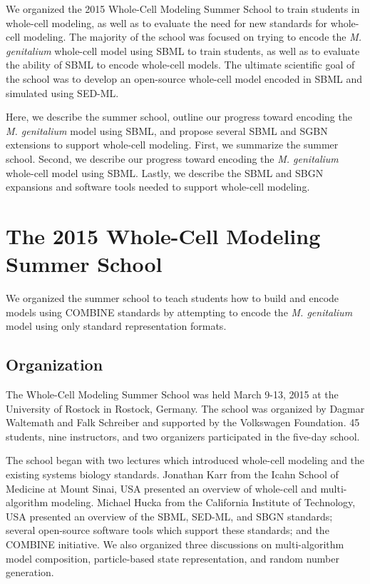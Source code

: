 \documentclass[journal,transmag]{IEEEtran}
\begin{document}
We organized the 2015 Whole-Cell Modeling Summer School to train students in whole-cell modeling, as well as to evaluate the need for new standards for whole-cell modeling. The majority of the school was focused on trying to encode the \textit{M. genitalium} whole-cell model using SBML to train students, as well as to evaluate the ability of SBML to encode whole-cell models. The ultimate scientific goal of the school was to develop an open-source whole-cell model encoded in SBML and simulated using SED-ML.

Here, we describe the summer school, outline our progress toward encoding the \textit{M. genitalium} model using SBML, and propose several SBML and SGBN extensions to support whole-cell modeling. First, we summarize the summer school. Second, we describe our progress toward encoding the \textit{M. genitalium} whole-cell model using SBML. Lastly, we describe the SBML and SBGN expansions and software tools needed to support whole-cell modeling.

\section{The 2015 Whole-Cell Modeling Summer School}
We organized the summer school to teach students how to build and encode models using COMBINE standards by attempting to encode the \textit{M. genitalium} model using only standard representation formats.

\subsection{Organization}
The Whole-Cell Modeling Summer School was held March 9-13, 2015 at the University of Rostock in Rostock, Germany. The school was organized by Dagmar Waltemath and Falk Schreiber and supported by the Volkswagen Foundation. 45 students, nine instructors, and two organizers participated in the five-day school.

The school began with two lectures which introduced whole-cell modeling and the existing systems biology standards. Jonathan Karr from the Icahn School of Medicine at Mount Sinai, USA presented an overview of whole-cell and multi-algorithm modeling. Michael Hucka from the California Institute of Technology, USA presented an overview of the SBML, SED-ML, and SBGN standards; several open-source software tools which support these standards; and the COMBINE initiative. We also organized three discussions on multi-algorithm model composition, particle-based state representation, and random number generation. 
\end{document}
